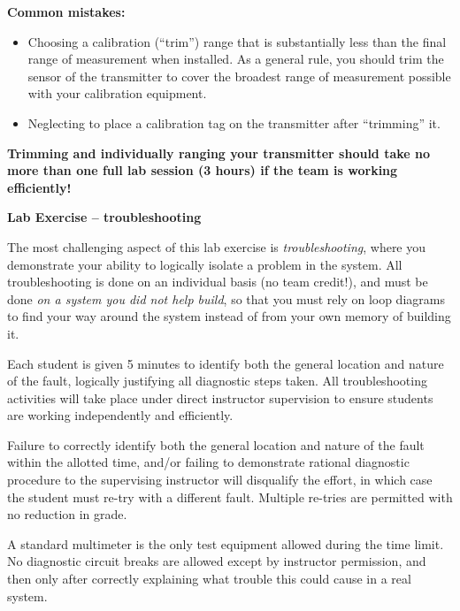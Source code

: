\documentclass[12pt,a4paper]{article}
\begin{document}
\vskip 10pt

{\bf Common mistakes:}

\begin{itemize}
\item{} Choosing a calibration (``trim'') range that is substantially less than the final range of measurement when installed.  As a general rule, you should trim the sensor of the transmitter to cover the broadest range of measurement possible with your calibration equipment.
\item{} Neglecting to place a calibration tag on the transmitter after ``trimming'' it.
\end{itemize}

\vskip 10pt

{\bf Trimming and individually ranging your transmitter should take no more than one full lab session (3 hours) if the team is working efficiently!}





\vfil \eject

\noindent
{\bf Lab Exercise -- troubleshooting}

\vskip 5pt

The most challenging aspect of this lab exercise is {\it troubleshooting}, where you demonstrate your ability to logically isolate a problem in the system.  All troubleshooting is done on an individual basis (no team credit!), and must be done {\it on a system you did not help build}, so that you must rely on loop diagrams to find your way around the system instead of from your own memory of building it.

Each student is given 5 minutes to identify both the general location and nature of the fault, logically justifying all diagnostic steps taken.  All troubleshooting activities will take place under direct instructor supervision to ensure students are working independently and efficiently. 

Failure to correctly identify both the general location and nature of the fault within the allotted time, and/or failing to demonstrate rational diagnostic procedure to the supervising instructor will disqualify the effort, in which case the student must re-try with a different fault.  Multiple re-tries are permitted with no reduction in grade.

A standard multimeter is the only test equipment allowed during the time limit.  No diagnostic circuit breaks are allowed except by instructor permission, and then only after correctly explaining what trouble this could cause in a real system.  
\end{document}
